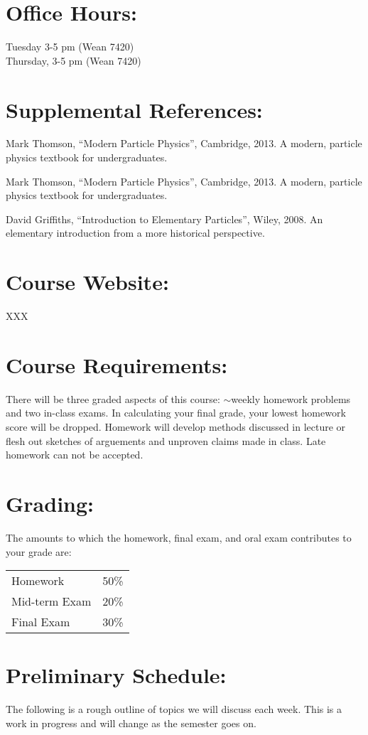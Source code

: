 \documentclass[margin,line]{res}
\begin{document}
\begin{resume}
\section{Office Hours:}
Tuesday 3-5 pm (Wean 7420)\\
Thursday, 3-5 pm (Wean 7420)


\section{Supplemental References:}
Mark Thomson, ``Modern Particle Physics'', Cambridge, 2013.
A modern, particle physics textbook for undergraduates.

Mark Thomson, ``Modern Particle Physics'', Cambridge, 2013.
A modern, particle physics textbook for undergraduates.

David Griffiths, ``Introduction to Elementary Particles'', Wiley, 2008.
An elementary introduction from a more historical perspective.

\section{Course Website:}  XXX

\section{Course Requirements:}
There will be three graded aspects of this course: $\sim$weekly homework problems and two in-class exams.
In calculating your final grade, your lowest homework score will be dropped.
Homework will develop methods discussed in lecture or flesh out sketches of arguements and unproven claims made in class.
Late homework can not be accepted.

\section{Grading:} 
The amounts to which the homework, final exam, and oral exam contributes to
your grade are:
\begin{center}
\begin{tabular}{lc}
Homework & 50\%\\
Mid-term Exam & 20\%\\
Final Exam & 30\%\\
\end{tabular}
\end{center}

\section{Preliminary Schedule:}

The following is a rough outline of topics we will discuss each week. 
This is a work in progress and will change as the semester goes on.



\end{resume}
\end{document}
